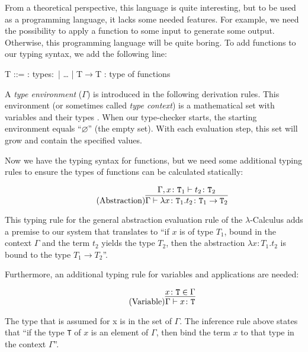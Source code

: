 From a theoretical perspective, this language is quite interesting, but to be used
as a programming language, it lacks some needed features. For example, we need the
possibility to apply a function to some input to generate some output. Otherwise,
this programming language will be quite boring. To add functions to our typing
syntax, we add the following line:

\begin{bnfgrammar}
    T ::= : types$\colon$
    | \dots
    | T$\rightarrow$T : type of functions
\end{bnfgrammar}

A \textit{type environment} ($\Gamma$) is introduced in the following derivation rules.
This environment (or sometimes called \textit{type context}) is
a mathematical set with variables and their types \cite{pierce2002ProgLang}.
When our type-checker starts, the starting environment equals
``$\varnothing$'' (the empty set). With each evaluation step, this set will grow
and contain the specified values.

Now we have the typing syntax for functions, but we need some additional typing
rules to ensure the types of functions can be calculated statically:

\begin{equation*}
    \tag{Abstraction}
    \infer{
        \Gamma \vdash \lambda x \colon \texttt{T}_1 . t_2 \colon \texttt{T}_1 \rightarrow \texttt{T}_2
    }{
        \Gamma,x \colon \texttt{T}_1 \vdash t_2 \colon \texttt{T}_2
    }
\end{equation*}

This typing rule for the general abstraction evaluation rule
of the $\lambda$-Calculus adds
a premise to our system that translates to ``if $x$ is of type
$T_1$, bound in the context $\Gamma$ and the term $t_2$ yields the type $T_2$,
then the abstraction $\lambda x \colon T_1 . t_2$ is bound to the type $T_1 \rightarrow T_2$''.

Furthermore, an additional typing rule for variables and applications
are needed:

\begin{equation*}
    \tag{Variable}
    \infer{
        \Gamma \vdash x \colon \texttt{T}
    }{
        x \colon \texttt{T} \in \Gamma
    }
\end{equation*}

The type that is assumed for x is in the set of $\Gamma$. The inference
rule above states that ``if the type \texttt{T} of $x$ is an element of
$\Gamma$, then bind the term $x$ to that type in the context $\Gamma$''.


